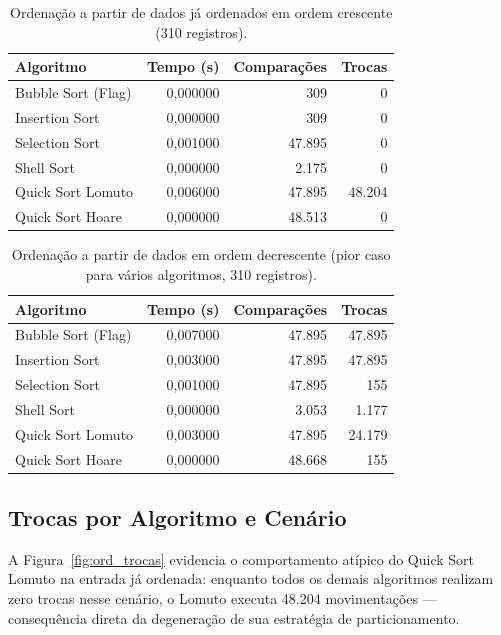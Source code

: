 \documentclass[12pt]{article}
\begin{document}
\begin{table}[H]
\centering
\caption{Ordenação a partir de dados já ordenados em ordem crescente (310 registros).}
\label{tab:ord_ordenado}
\begin{tabular}{lrrr}
\toprule
\textbf{Algoritmo} & \textbf{Tempo (s)} & \textbf{Comparações} & \textbf{Trocas} \\
\midrule
Bubble Sort (Flag) & 0,000000 &    309 &      0 \\
Insertion Sort     & 0,000000 &    309 &      0 \\
Selection Sort     & 0,001000 & 47.895 &      0 \\
Shell Sort         & 0,000000 &  2.175 &      0 \\
Quick Sort Lomuto  & 0,006000 & 47.895 & 48.204 \\
Quick Sort Hoare   & 0,000000 & 48.513 &      0 \\
\bottomrule
\end{tabular}
\end{table}

\begin{table}[H]
\centering
\caption{Ordenação a partir de dados em ordem decrescente (pior caso para vários algoritmos, 310 registros).}
\label{tab:ord_decrescente}
\begin{tabular}{lrrr}
\toprule
\textbf{Algoritmo} & \textbf{Tempo (s)} & \textbf{Comparações} & \textbf{Trocas} \\
\midrule
Bubble Sort (Flag) & 0,007000 & 47.895 & 47.895 \\
Insertion Sort     & 0,003000 & 47.895 & 47.895 \\
Selection Sort     & 0,001000 & 47.895 &    155 \\
Shell Sort         & 0,000000 &  3.053 &  1.177 \\
Quick Sort Lomuto  & 0,003000 & 47.895 & 24.179 \\
Quick Sort Hoare   & 0,000000 & 48.668 &    155 \\
\bottomrule
\end{tabular}
\end{table}

\subsection{Trocas por Algoritmo e Cenário}

A Figura~\ref{fig:ord_trocas} evidencia o comportamento atípico do Quick Sort Lomuto na entrada já ordenada: enquanto todos os demais algoritmos realizam zero trocas nesse cenário, o Lomuto executa 48.204 movimentações --- consequência direta da degeneração de sua estratégia de particionamento.
\end{document}
